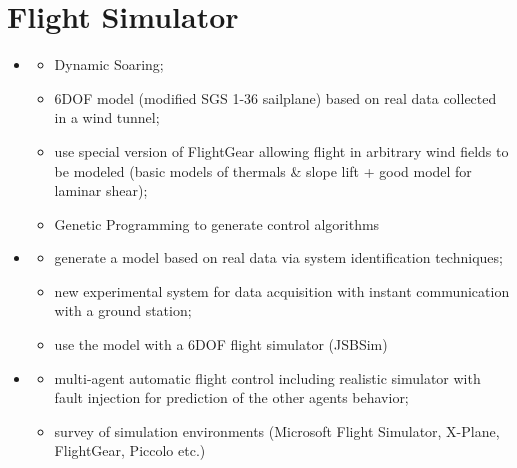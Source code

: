 \documentclass[]{article}
\begin{document}
\section*{Flight Simulator}
\begin{itemize}
	\item \cite{boslough2002autonomous}
	\begin{itemize}
		\item Dynamic Soaring;
		\item 6DOF model (modified SGS 1-36 sailplane) based on real data collected in a wind tunnel;
		\item use special version of FlightGear allowing flight in arbitrary wind
		fields to be modeled (basic models of thermals \& slope lift + good model for laminar shear);
		\item Genetic Programming to generate control algorithms
	\end{itemize}

	\item \cite{coiro2008flight}
	\begin{itemize}
		\item generate a model based on real data via system identification techniques;
		\item new experimental system for data acquisition with instant communication with a ground station;
		\item use the model with a 6DOF flight simulator (JSBSim)
	\end{itemize}

	\item \cite{gimenes2008using}
	\begin{itemize}
		\item multi-agent automatic flight control including realistic simulator with fault injection for prediction of the other agents behavior;
		\item survey of simulation environments (Microsoft Flight Simulator, X-Plane, FlightGear, Piccolo etc.)
	\end{itemize}
\end{itemize}


\end{document}
